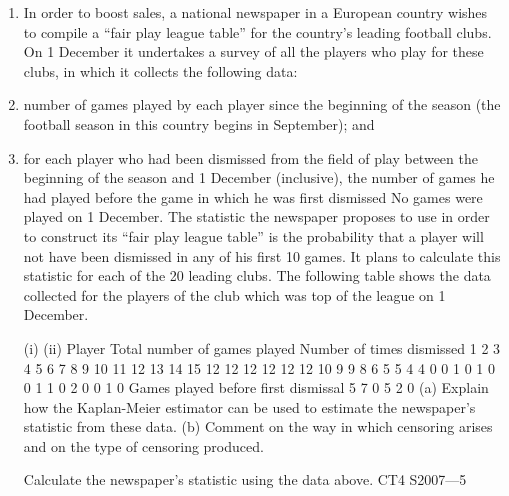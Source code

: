 \documentclass[a4paper,12pt]{article}
\begin{document}
\begin{enumerate}
\item In order to boost sales, a national newspaper in a European country wishes to compile
a “fair play league table” for the country’s leading football clubs. On 1 December it
undertakes a survey of all the players who play for these clubs, in which it collects the
following data:
\item number of games played by each player since the beginning of the season (the
football season in this country begins in September); and
\item for each player who had been dismissed from the field of play between the
beginning of the season and 1 December (inclusive), the number of games he had
played before the game in which he was first dismissed
No games were played on 1 December.
The statistic the newspaper proposes to use in order to construct its “fair play league
table” is the probability that a player will not have been dismissed in any of his first
10 games. It plans to calculate this statistic for each of the 20 leading clubs.
The following table shows the data collected for the players of the club which was top
of the league on 1 December.

(i)
(ii)
Player Total number
of games played Number of times
dismissed
1
2
3
4
5
6
7
8
9
10
11
12
13
14
15 12
12
12
12
12
12
10
9
9
8
6
5
5
4
4 0
0
1
0
1
0
0
1
1
0
2
0
0
1
0
Games
played before
first dismissal
5
7
0
5
2
0
(a) Explain how the Kaplan-Meier estimator can be used to estimate the newspaper’s statistic from these data.
(b) Comment on the way in which censoring arises and on the type of censoring produced.

Calculate the newspaper’s statistic using the data above.
CT4 S2007—5


\end{enumerate}
\end{document}
